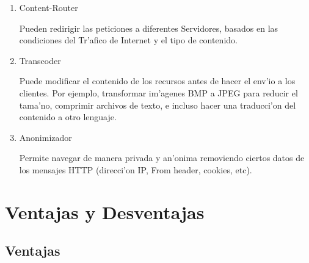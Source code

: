 \begin{enumerate}
\item Content-Router

Pueden redirigir las peticiones a diferentes Servidores, basados en las condiciones del Tr'afico de Internet y el tipo de contenido.

\item Transcoder

Puede modificar el contenido de los recursos antes de hacer el env'io a los clientes. Por ejemplo, transformar im'agenes BMP a JPEG para reducir el tama'no, comprimir archivos de texto, e incluso hacer una traducci'on del contenido a otro lenguaje.

\item Anonimizador

Permite navegar de manera privada y an'onima removiendo ciertos datos de los mensajes HTTP (direcci'on IP, From header, cookies, etc).

\end{enumerate}

\section{Ventajas y Desventajas}

\subsection{Ventajas}

